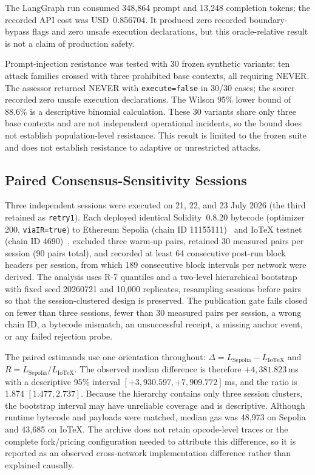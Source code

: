 \documentclass[journal]{IEEEtran}
\newif\ifshowrevisions
\newenvironment{revision}{\begingroup\ifshowrevisions\color{blue}\else\color{black}\fi}{\endgroup}
\newcommand{\rev}[1]{{\ifshowrevisions\color{blue}\else\color{black}\fi #1}}
\begin{document}
\begin{revision}
The LangGraph run consumed 348{,}864 prompt and 13{,}248 completion tokens;
the recorded API cost was USD~0.856704. It produced zero recorded boundary-bypass flags and
zero unsafe execution declarations, but this oracle-relative result is not a claim of
production safety.

Prompt-injection resistance was tested with 30 frozen synthetic variants:
ten attack families crossed with three prohibited base contexts, all requiring
NEVER. The assessor returned NEVER with \texttt{execute=false} in 30/30 cases;
the scorer recorded zero unsafe execution declarations. The Wilson 95\% lower
bound of 88.6\% is a descriptive binomial calculation. These 30 variants share
only three base contexts and are not independent operational incidents, so the
bound does not establish population-level resistance. This result is limited
to the frozen suite and does not establish resistance to adaptive or
unrestricted attacks.

\end{revision}
\subsection{Paired Consensus-Sensitivity Sessions}
\label{sec:paired-detail}
Three independent sessions were executed on 21, 22, and 23 July 2026 (the
third retained as \texttt{retry1}). Each deployed identical Solidity~0.8.20
bytecode (optimizer 200, \texttt{viaIR=true}) to Ethereum Sepolia (chain ID
11155111)~\rev{\cite{sepolia}} and IoTeX testnet (chain ID 4690)~\rev{\cite{iotex}}, excluded three warm-up pairs,
retained 30 measured pairs per session (90 pairs total), and recorded at least
64 consecutive post-run block headers per session, from which 189 consecutive
block intervals per network were derived. The analysis uses R-7 quantiles and
a two-level hierarchical bootstrap with fixed seed 20260721 and 10{,}000
replicates, resampling sessions before pairs so that the session-clustered
design is preserved. The publication gate fails closed on fewer than three
sessions, fewer than 30 measured pairs per session, a wrong chain ID, a
bytecode mismatch, an unsuccessful receipt, a missing anchor event, or any
failed rejection probe.

The paired estimands use one orientation throughout:
$\Delta=L_{\mathrm{Sepolia}}-L_{\mathrm{IoTeX}}$ and
$R=L_{\mathrm{Sepolia}}/L_{\mathrm{IoTeX}}$. The observed median difference
is therefore $+4{,}381.823$\,ms with a descriptive 95\% interval
$[+3{,}930.597,+7{,}909.772]$\,ms, and the ratio is 1.874
$[1.477,2.737]$. Because the hierarchy contains only three session clusters,
the bootstrap interval may have unreliable coverage and is descriptive.
Although runtime bytecode and payloads were matched, median gas was 48{,}973
on Sepolia and 43{,}685 on IoTeX. The archive does not retain opcode-level
traces or the complete fork/pricing configuration needed to attribute this
difference, so it is reported as an observed cross-network implementation
difference rather than explained causally.
\end{document}
